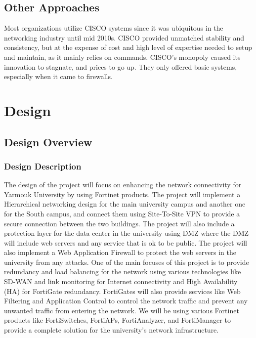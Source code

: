 \documentclass[12pt]{report}
\begin{document}
\section{Other Approaches}
Most organizations utilize CISCO systems since it was ubiquitous in the networking industry until mid 2010s. CISCO provided unmatched stability and consistency, but at the expense of cost and high level of expertise needed to setup and maintain, as it mainly relies on commands. CISCO's monopoly caused its innovation to stagnate, and prices to go up. They only offered basic systems, especially when it came to firewalls.


\chapter{Design}

\section{Design Overview}
\subsection{Design Description}
The design of the project will focus on enhancing the network connectivity for Yarmouk University by using Fortinet products. The project will implement a Hierarchical networking design for the main university campus and another one for the South campus, and connect them using Site-To-Site VPN to provide a secure connection between the two buildings. The project will also include a protection layer for the data center in the university using DMZ where the DMZ will include web servers and any service that is ok to be public. The project will also implement a Web Application Firewall to protect the web servers in the university from any attacks. One of the main focuses of this project is to provide redundancy and load balancing for the network using various technologies like SD-WAN and link monitoring for Internet connectivity and High Availability (HA) for FortiGate redundancy. FortiGates will also provide services like Web Filtering and Application Control to control the network traffic and prevent any unwanted traffic from entering the network.\cite{RedLB} We will be using various Fortinet products like FortiSwitches, FortiAPs, FortiAnalyzer, and FortiManager to provide a complete solution for the university's network infrastructure.
\end{document}
